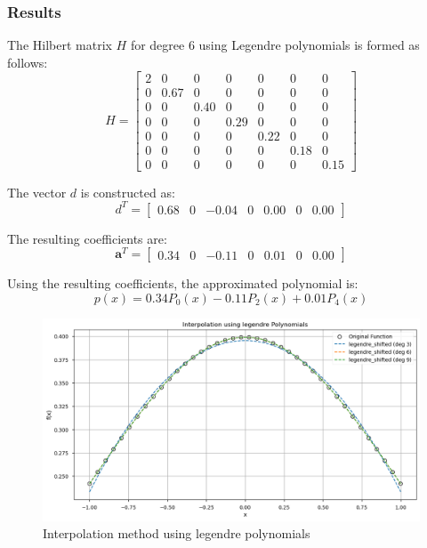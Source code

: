 \documentclass[10pt]{article}
\begin{document}
\subsubsection{Results}
The Hilbert matrix \( H \) for degree 6 using Legendre polynomials is formed as follows:
\[
H = \begin{bmatrix}
2 & 0 & 0 & 0 & 0 & 0 & 0 \\
0 & 0.67 & 0 & 0 & 0 & 0 & 0 \\
0 & 0 & 0.40 & 0 & 0 & 0 & 0 \\
0 & 0 & 0 & 0.29 & 0 & 0 & 0 \\
0 & 0 & 0 & 0 & 0.22 & 0 & 0 \\
0 & 0 & 0 & 0 & 0 & 0.18 & 0 \\
0 & 0 & 0 & 0 & 0 & 0 & 0.15
\end{bmatrix}
\]

The vector \( d \) is constructed as:
\[
d^T = \begin{bmatrix}
0.68 & 0 & -0.04 & 0 & 0.00 & 0 & 0.00
\end{bmatrix}
\]

The resulting coefficients are:
\[
\mathbf{a}^T = \begin{bmatrix}
0.34 & 0 & -0.11 & 0 & 0.01 & 0 & 0.00
\end{bmatrix}
\]

Using the resulting coefficients, the approximated polynomial is:
\begin{equation}
p(x) = 0.34 P_0(x) - 0.11 P_2(x) + 0.01 P_4(x)
\end{equation}




\begin{figure}[H]
    \centering
    \includegraphics[width=\imagewidth\textwidth]{figures/02_interpolation/interpolation_method_legendre_shifted.png}
    \caption{Interpolation method using legendre polynomials}
\end{figure}
\end{document}
